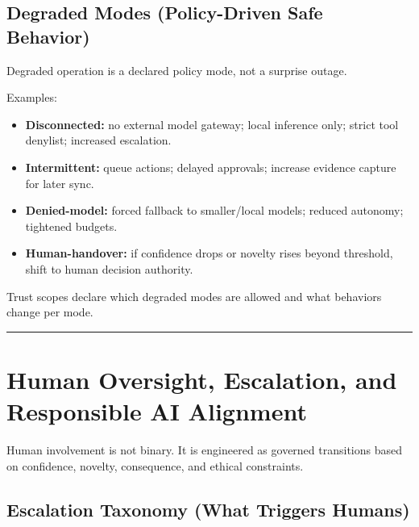 \documentclass[11pt]{article}
\begin{document}
\hypertarget{degraded-modes-policy-driven-safe-behavior}{%
\subsection{Degraded Modes (Policy-Driven Safe Behavior)}\label{degraded-modes-policy-driven-safe-behavior}}

Degraded operation is a declared policy mode, not a surprise outage.

Examples:

\begin{itemize}
\tightlist
\item
  \textbf{Disconnected:} no external model gateway; local inference
  only; strict tool denylist; increased escalation.
\item
  \textbf{Intermittent:} queue actions; delayed approvals; increase
  evidence capture for later sync.
\item
  \textbf{Denied-model:} forced fallback to smaller/local models;
  reduced autonomy; tightened budgets.
\item
  \textbf{Human-handover:} if confidence drops or novelty rises beyond
  threshold, shift to human decision authority.
\end{itemize}

Trust scopes declare which degraded modes are allowed and what behaviors
change per mode.

\vspace{2pt}\begin{center}\rule{0.62\linewidth}{0.6pt}\end{center}\vspace{2pt}

\hypertarget{human-oversight-escalation-and-responsible-ai-alignment}{%
\section{Human Oversight, Escalation, and Responsible AI Alignment}\label{human-oversight-escalation-and-responsible-ai-alignment}}

Human involvement is not binary. It is engineered as governed
transitions based on confidence, novelty, consequence, and ethical
constraints.

\hypertarget{escalation-taxonomy-what-triggers-humans}{%
\subsection{Escalation Taxonomy (What Triggers Humans)}\label{escalation-taxonomy-what-triggers-humans}}
\end{document}

